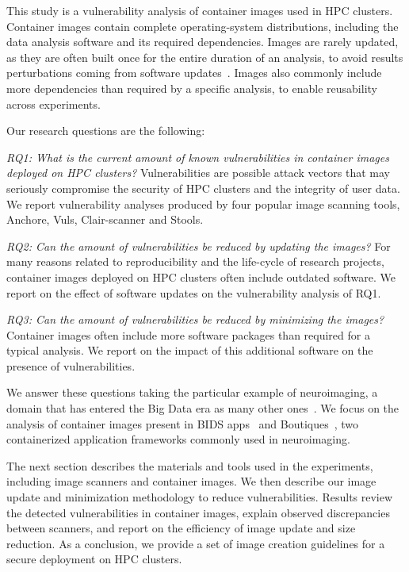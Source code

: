 \documentclass[a4paper,num-refs]{oup-contemporary}
\begin{document}
This study is a vulnerability analysis of container images used in HPC
clusters. Container images contain complete operating-system distributions,
including the data analysis software and its required dependencies.
Images are rarely updated, as they are often built once
for the entire duration of an analysis, to avoid results perturbations
coming from software updates~\cite{gronenschild2012effects, glatard2015reproducibility}. Images also
commonly include more dependencies than required by a specific analysis, to 
enable reusability across experiments.

Our research questions are the following:

\textit{RQ1: What is the current amount of known vulnerabilities in
container images deployed on HPC clusters?} Vulnerabilities are possible
attack vectors that may seriously compromise the security of HPC clusters
and the integrity of user data. We report vulnerability analyses produced
by four popular image scanning tools, Anchore, Vuls, Clair-scanner and Stools.

\textit{RQ2: Can the amount of vulnerabilities be reduced by updating the images?}  
For many reasons related to reproducibility and the life-cycle of research
projects, container images deployed on HPC clusters often include outdated
software. We report on the effect of software updates on the vulnerability
analysis of RQ1.

\textit{RQ3: Can the amount of vulnerabilities be reduced by minimizing the images?} 
Container images often include more software packages than required for a
typical analysis. We report on the impact of this additional software on
the presence of vulnerabilities.

We answer these questions taking the particular example of neuroimaging, a
domain that has entered the Big Data era as many other
ones~\cite{van2014human}. We focus on the analysis of container images
present in BIDS apps~\cite{gorgolewski2017bids} and Boutiques~\cite{glatard2018boutiques}, two containerized
application frameworks commonly used in neuroimaging. 


The next section describes the materials and tools used in the experiments,
including image scanners and container images. We then describe our image
update and minimization methodology to reduce vulnerabilities. Results review
the detected vulnerabilities in container images, explain observed
discrepancies between scanners, and report on the efficiency of image
update and size reduction. As a conclusion, we provide a set of image
creation guidelines for a secure deployment on HPC clusters.
\end{document}
